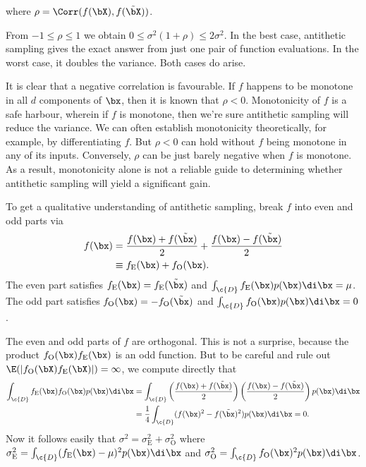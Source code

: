 where $\rho = \Corr(f(\bX), f(\tilde{\bX}))$.

From $-1 \le \rho \le 1$ we obtain $0 \le \sigma^2(1+\rho) \le 2\sigma^2$. In the best case, antithetic sampling gives the exact answer from just one pair of function evaluations. In the worst case, it doubles the variance. Both cases do arise.

It is clear that a negative correlation is favourable. If $f$ happens to be monotone in all $d$ components of $\bx$, then it is known that $\rho < 0$. Monotonicity of $f$ is a safe harbour, wherein if $f$ is monotone, then we're sure antithetic sampling will reduce the variance. We can often establish monotonicity theoretically, for example, by differentiating $f$. But $\rho < 0$ can hold without $f$ being monotone in any of its inputs. Conversely, $\rho$ can be just barely negative when $f$ is monotone. As a result, monotonicity alone is not a reliable guide to determining whether antithetic sampling will yield a significant gain.

To get a qualitative understanding of antithetic sampling, break $f$ into even and odd parts via
\begin{align} \label{eq:EvenOddDecomposition}
	f(\bx) & = \frac{f(\bx) + f(\tilde{\bx})}{2} + \frac{f(\bx) - f(\tilde{\bx})}{2} \notag \\
	       & \equiv f_{\mathrm{E}}(\bx) + f_{\mathrm{O}}(\bx).
\end{align}
The even part satisfies $f_{\mathrm{E}}(\bx) = f_{\mathrm{E}}(\tilde{\bx})$ and $\int_{\c{D}} f_{\mathrm{E}}(\bx)p(\bx) \di \bx = \mu$. The odd part satisfies $f_{\mathrm{O}}(\bx) = -f_{\mathrm{O}}(\tilde{\bx})$ and $\int_{\c{D}} f_{\mathrm{O}}(\bx)p(\bx) \di \bx = 0$.

The even and odd parts of $f$ are orthogonal. This is not a surprise, because the product $f_{\mathrm{O}}(\bx)f_{\mathrm{E}}(\bx)$ is an odd function. But to be careful and rule out $\E(|f_{\mathrm{O}}(\bX)f_{\mathrm{E}}(\bX)|) = \infty$, we compute directly that
\begin{align*}
	\int_{\c{D}} f_{\mathrm{E}}(\bx)f_{\mathrm{O}}(\bx)p(\bx) \di \bx & = \int_{\c{D}} \left(\frac{f(\bx) + f(\tilde{\bx})}{2}\right) \left(\frac{f(\bx) - f(\tilde{\bx})}{2}\right) p(\bx) \di \bx \\
	                                                                  & = \frac{1}{4} \int_{\c{D}} (f(\bx)^2 - f(\tilde{\bx})^2) p(\bx) \di \bx = 0.
\end{align*}
Now it follows easily that $\sigma^2 = \sigma_{\mathrm{E}}^2 + \sigma_{\mathrm{O}}^2$ where $\sigma_{\mathrm{E}}^2 = \int_{\c{D}} (f_{\mathrm{E}}(\bx) - \mu)^2 p(\bx) \di \bx$ and $\sigma_{\mathrm{O}}^2 = \int_{\c{D}} f_{\mathrm{O}}(\bx)^2 p(\bx) \di \bx$.

